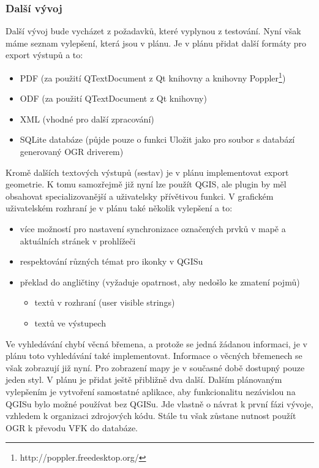 \documentclass[a4paper,10pt]{article}
\begin{document}
\subsubsection{Další vývoj}
Další vývoj bude vycházet z požadavků, které vyplynou z testování. Nyní však máme seznam vylepšení, která jsou v plánu. Je v plánu přidat další formáty pro export výstupů a to:
\begin{itemize}
\item PDF (za použití QTextDocument z Qt knihovny a knihovny Poppler\footnote{http://poppler.freedesktop.org/})
\item ODF (za použití QTextDocument z Qt knihovny)
\item XML (vhodné pro další zpracování)
\item SQLite databáze (půjde pouze o funkci Uložit jako pro soubor s databází generovaný OGR driverem)
\end{itemize}
Kromě dalších textových výstupů (sestav) je v plánu implementovat export geometrie.
K tomu samozřejmě již nyní lze použít QGIS, ale plugin by měl obsahovat specializovanější a uživatelsky přívětivou funkci.
V grafickém uživatelském rozhraní je v plánu také několik vylepšení a to:
\begin{itemize}
\item více možností pro nastavení synchronizace označených prvků v mapě a aktuálních stránek v prohlížeči
\item respektování různých témat pro ikonky v QGISu
\item překlad do angličtiny (vyžaduje opatrnost, aby nedošlo ke zmatení pojmů)
    \begin{itemize}
    \item textů v rozhraní (user visible strings)
    \item textů ve výstupech
    \end{itemize}
\end{itemize}
Ve vyhledávání chybí věcná břemena, a protože se jedná žádanou informaci, je v plánu toto vyhledávání také implementovat.
Informace o věcných břemenech se však zobrazují již nyní.
Pro zobrazení mapy je v současné době dostupný pouze jeden styl.
V plánu je přidat ještě přibližně dva další.
Dalším plánovaným vylepšením je vytvoření samostatné aplikace, aby funkcionalitu nezávislou na QGISu bylo možné používat bez QGISu.
Jde vlastně o návrat k první fázi vývoje, vzhledem k organizaci zdrojových kódu.
Stále tu však zůstane nutnost použít OGR k převodu VFK do databáze.
\end{document}
